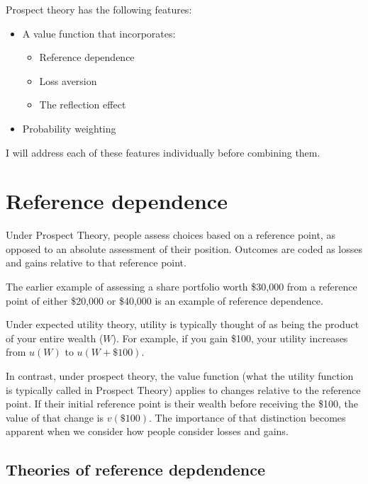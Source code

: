 \documentclass[
  letterpaper,
  DIV=11,
  numbers=noendperiod]{scrreprt}
\providecommand{\tightlist}{%
  \setlength{\itemsep}{0pt}\setlength{\parskip}{0pt}}\usepackage{longtable,booktabs,array}
\begin{document}
Prospect theory has the following features:

\begin{itemize}
\tightlist
\item
  A value function that incorporates:

  \begin{itemize}
  \tightlist
  \item
    Reference dependence
  \item
    Loss aversion
  \item
    The reflection effect
  \end{itemize}
\item
  Probability weighting
\end{itemize}

I will address each of these features individually before combining
them.

\hypertarget{reference-dependence}{%
\chapter{Reference dependence}\label{reference-dependence}}

Under Prospect Theory, people assess choices based on a reference point,
as opposed to an absolute assessment of their position. Outcomes are
coded as losses and gains relative to that reference point.

The earlier example of assessing a share portfolio worth \$30,000 from a
reference point of either \$20,000 or \$40,000 is an example of
reference dependence.

Under expected utility theory, utility is typically thought of as being
the product of your entire wealth (\(W\)). For example, if you gain
\$100, your utility increases from \(u(W)\) to \(u(W+\$100)\).

In contrast, under prospect theory, the value function (what the utility
function is typically called in Prospect Theory) applies to changes
relative to the reference point. If their initial reference point is
their wealth before receiving the \$100, the value of that change is
\(v(\$100)\). The importance of that distinction becomes apparent when
we consider how people consider losses and gains.

\hypertarget{theories-of-reference-depdendence}{%
\section{Theories of reference
depdendence}\label{theories-of-reference-depdendence}}
\end{document}
